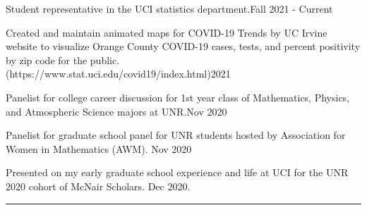 \documentclass{article}
\begin{document}


\begin{description}
	\vspace{-2mm}
	\item[Professional Service and Outreach]\hspace*{.1in} 
	
		Student representative in the UCI statistics department.\hfill{Fall 2021 - Current}
	
		Created and maintain animated maps for COVID-19 Trends by UC Irvine website to visualize Orange County COVID-19 cases, tests, and percent positivity by zip code for the public.\\
		 (https://www.stat.uci.edu/covid19/index.html)\hfill{2021} \\ \vspace{-3mm}
	
		Panelist for college career discussion for 1st year class of Mathematics, Physics, and Atmospheric Science majors at UNR.\hfill{Nov 2020}\\ \vspace{-3mm}
		
		Panelist for graduate school panel for UNR students hosted by Association for Women in Mathematics (AWM). \hfill{Nov 2020}\\ \vspace{-3mm}
		
		Presented on my early graduate school experience and life at UCI for the UNR 2020 cohort of McNair Scholars. \hfill{Dec 2020}.
	
\end{description}
\vspace{-2mm}
\rule{\linewidth}{1pt}


	
	
\end{document}
